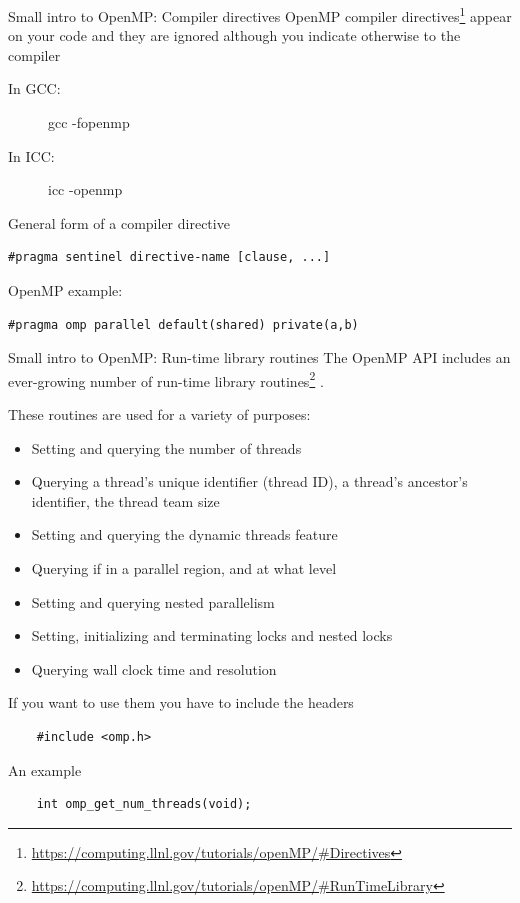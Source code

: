 \documentclass[10pt,xcolor=table]{beamer}
\begin{document}
\begin{frame}[fragile]{Small intro to OpenMP: Compiler directives}
OpenMP compiler directives\footnote{\url{https://computing.llnl.gov/tutorials/openMP/\#Directives}}  appear on your code and they are ignored although you indicate otherwise to the compiler
\begin{description}
\item[In GCC:] gcc -fopenmp
\item[In ICC:] icc -openmp
\end{description}

General form of a compiler directive

\begin{verbatim}
#pragma sentinel directive-name [clause, ...]
\end{verbatim}

OpenMP example:

\begin{verbatim}
#pragma omp parallel default(shared) private(a,b)
\end{verbatim}

\end{frame}

\begin{frame}[fragile]{Small intro to OpenMP: Run-time library routines}
The OpenMP API includes an ever-growing number of run-time library routines\footnote{\url{https://computing.llnl.gov/tutorials/openMP/\#RunTimeLibrary}} .

These routines are used for a variety of purposes:

\begin{itemize}
    \tiny
    \item Setting and querying the number of threads
    \item Querying a thread's unique identifier (thread ID), a thread's ancestor's identifier, the thread team size
    \item Setting and querying the dynamic threads feature
    \item Querying if in a parallel region, and at what level
    \item Setting and querying nested parallelism
    \item Setting, initializing and terminating locks and nested locks
    \item Querying wall clock time and resolution
\end{itemize}

If you want to use them you have to include the headers

\begin{verbatim}
    #include <omp.h>
\end{verbatim}

An example

\begin{verbatim}
    int omp_get_num_threads(void);
\end{verbatim}

\end{frame}
\end{document}
